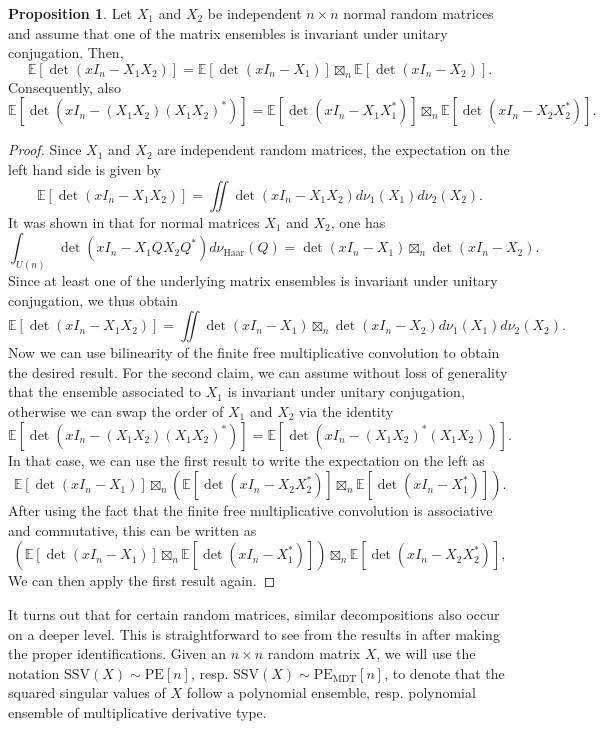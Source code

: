 \documentclass[a4paper,12pt,oneside]{article}
\theoremstyle{definition}
\newtheorem{prop}[defi]{Proposition}
\begin{document}
\begin{prop} \label{MC_AP}
    Let $X_1$ and $X_2$ be independent $n\times n$ normal random matrices and assume that one of the matrix ensembles is invariant under unitary conjugation. Then, 
    $$\mathbb{E}[\det(xI_n-X_1X_2)] = \mathbb{E}[\det(xI_n-X_1)] \boxtimes_n \mathbb{E}[\det(xI_n-X_2)].$$
    Consequently, also 
    $$\mathbb{E}[\det(xI_n-(X_1X_2)(X_1X_2)^\ast)] = \mathbb{E}[\det(xI_n-X_1X_1^\ast)] \boxtimes_n \mathbb{E}[\det(xI_n-X_2X_2^\ast)].$$
\end{prop}
\begin{proof}
    Since $X_1$ and $X_2$ are independent random matrices, the expectation on the left hand side is given by
    $$\mathbb{E}[\det(xI_n-X_1X_2)] = \iint \det(xI_n-X_1X_2) d\nu_1(X_1)d\nu_2(X_2). $$
    It was shown in \cite[Thm. 1.5]{MSS:fin_free_conv} that for normal matrices $X_1$ and $X_2$, one has
    $$\int_{U(n)} \det(xI_n-X_1QX_2Q^\ast) d\nu_{\text{Haar}}(Q) = \det(xI_n-X_1) \boxtimes_n \det(xI_n-X_2).$$
    Since at least one of the underlying matrix ensembles is invariant under unitary conjugation, we thus obtain
    $$\mathbb{E}[\det(xI_n-X_1X_2)] = \iint\det(xI_n-X_1) \boxtimes_n \det(xI_n-X_2) d\nu_1(X_1)d\nu_2(X_2). $$
    Now we can use bilinearity of the finite free multiplicative convolution to obtain the desired result.
    For the second claim, we can assume without loss of generality that the ensemble associated to $X_1$ is invariant under unitary conjugation, otherwise we can swap the order of $X_1$ and $X_2$ via the identity
        $$\mathbb{E}[\det(xI_n-(X_1X_2)(X_1X_2)^\ast)] = \mathbb{E}[\det(xI_n-(X_1X_2)^\ast(X_1X_2))].$$
    In that case, we can use the first result to write the expectation on the left as $$\mathbb{E}[\det(xI_n-X_1)] \boxtimes_n (\mathbb{E}[\det(xI_n-X_2X_2^\ast)] \boxtimes_n \mathbb{E}[\det(xI_n-X_1^\ast)]). $$
    After using the fact that the finite free multiplicative convolution is associative and commutative, this can be written as
    $$(\mathbb{E}[\det(xI_n-X_1)] \boxtimes_n \mathbb{E}[\det(xI_n-X_1^\ast)]) \boxtimes_n \mathbb{E}[\det(xI_n-X_2X_2^\ast)], $$
    We can then apply the first result again.
\end{proof}


It turns out that for certain random matrices, similar decompositions also occur on a deeper level. This is straightforward to see from the results in \cite{KK:SV_EV,KK:mult_conv} after making the proper identifications. Given an $n\times n$ random matrix $X$, we will use the notation $\text{SSV}(X)\sim\text{PE}[n]$, resp. $\text{SSV}(X)\sim\text{PE}_{\text{MDT}}[n]$, to denote that the squared singular values of $X$ follow a polynomial ensemble, resp. polynomial ensemble of multiplicative derivative type.  
\end{document}
